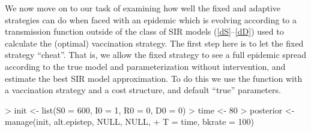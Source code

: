 \documentclass[shortnames,nojss]{jss}
\begin{document}
We now move on to our task of examining how well the fixed and
adaptive strategies can do when faced with an epidemic which is
evolving according to a transmission function outside of the class of
SIR models (\ref{dS}--\ref{dD}) used to calculate the (optimal)
vaccination strategy. The first step here is to let the fixed strategy
``cheat''.  That is, we allow the fixed strategy to see a full
epidemic spread according to the true model and parameterization
without intervention, and estimate the best SIR model
approximation. To do this we use the  function with a
 vaccination strategy and a  cost structure, and
default ``true'' parameters.
%
%
%
%
\begin{Schunk}
\begin{Sinput}
> init <- list(S0 = 600, I0 = 1, R0 = 0, D0 = 0)
> time <- 80
> posterior <- manage(init, alt.epistep, NULL, NULL, 
+     T = time, bkrate = 100)
\end{Sinput}
\end{Schunk}
\end{document}
